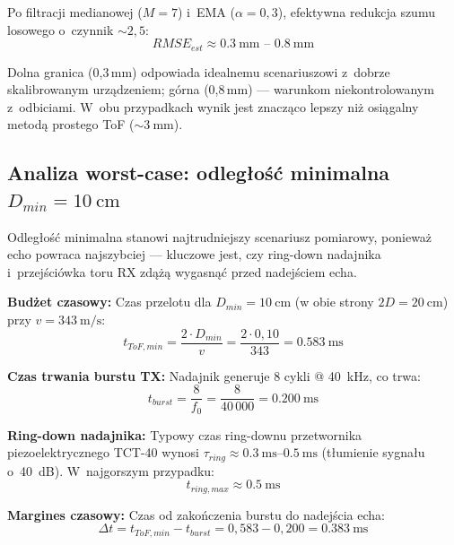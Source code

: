 \documentclass[a4paper,11pt]{article}
\begin{document}
	Po filtracji medianowej ($M = 7$) i~EMA ($\alpha = 0{,}3$), efektywna
	redukcja szumu losowego o~czynnik ${\sim}2{,}5$:
	\begin{equation}
		\boxed{RMSE_{est} \approx \SI{0,3}{\milli\metre} \text{ -- } \SI{0,8}{\milli\metre}}
		\label{eq:rmse_final}
	\end{equation}
	
	Dolna granica (0,3\,mm) odpowiada idealnemu scenariuszowi z~dobrze
	skalibrowanym urządzeniem; górna (0,8\,mm) --- warunkom niekontrolowanym
	z~odbiciami. W~obu przypadkach wynik jest znacząco lepszy niż osiągalny
	metodą prostego ToF (${\sim}\SI{3}{\milli\metre}$).
	
	\subsection{Analiza worst-case: odległość minimalna $D_{min} = \SI{10}{\centi\metre}$}
	\label{sec:worst_case_dmin}
	
	Odległość minimalna stanowi najtrudniejszy scenariusz pomiarowy, ponieważ
	echo powraca najszybciej --- kluczowe jest, czy ring-down nadajnika
	i~przejściówka toru RX zdążą wygasnąć przed nadejściem echa.
	
	\textbf{Budżet czasowy:}
	Czas przelotu dla $D_{min} = \SI{10}{\centi\metre}$ (w obie strony
	$2D = \SI{20}{\centi\metre}$) przy $v = \SI{343}{\metre\per\second}$:
	\begin{equation}
		t_{ToF,min} = \frac{2 \cdot D_{min}}{v} = \frac{2 \cdot 0{,}10}{343} = \SI{0,583}{\milli\second}
		\label{eq:tof_min}
	\end{equation}
	
	\textbf{Czas trwania burstu TX:}
	Nadajnik generuje 8 cykli @ \SI{40}{\kilo\hertz}, co trwa:
	\begin{equation}
		t_{burst} = \frac{8}{f_0} = \frac{8}{40\,000} = \SI{0,200}{\milli\second}
		\label{eq:t_burst}
	\end{equation}
	
	\textbf{Ring-down nadajnika:}
	Typowy czas ring-downu przetwornika piezoelektrycznego TCT-40 wynosi
	$\tau_{ring} \approx \SIrange{0,3}{0,5}{\milli\second}$ (tłumienie
	sygnału o~\SI{40}{\deci\bel}). W~najgorszym przypadku:
	\begin{equation}
		t_{ring,max} \approx \SI{0,5}{\milli\second}
		\label{eq:t_ring}
	\end{equation}
	
	\textbf{Margines czasowy:}
	Czas od zakończenia burstu do nadejścia echa:
	\begin{equation}
		\Delta t = t_{ToF,min} - t_{burst} = 0{,}583 - 0{,}200 = \SI{0,383}{\milli\second}
		\label{eq:dt_margin}
	\end{equation}
	
\end{document}
